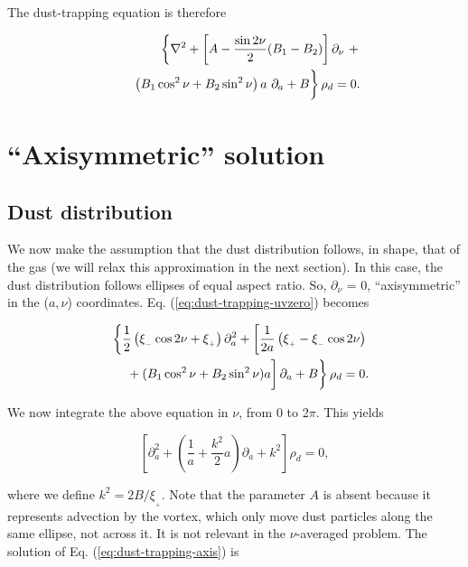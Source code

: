 \documentclass[apj]{emulateapj}
\def\white#1{\textcolor{white}{#1}}
\def\blue#1{\textcolor{blue}{ #1}}
\newcommand{\Laplace}{\nabla^2}
\newcommand{\Eq}[1]{Eq. (\ref{#1})}
\newcommand{\eq}[1]{\Eq{#1}}
\newcommand{\beq}{\begin{equation}}
\newcommand{\eeq}{\end{equation}}
\newcommand{\beqn}{\begin{eqnarray}}
\newcommand{\eeqn}{\end{eqnarray}}
\newcommand{\epsp}{\xi_{_{+}}}
\newcommand{\epsm}{\xi_{_{-}}}
\begin{document}
The dust-trapping equation is therefore 

\beqn 
&& \left\{ \Laplace{} + \left[A - \frac{\sin2\nu}{2}  (B_1 - B_2)\right]\partial_\nu \ +  \right.  \nonumber\\
&& \left. \white{\frac{1}{1}}\left( B_1 \cos^2\nu   + B_2\sin^2\nu
  \right) a \ \partial_a  + B \right\} \rho_d = 0. \label{eq:dust-trapping-uvzero}
\eeqn


\section{``Axisymmetric'' solution}
\label{sect:axisymmetric}

\subsection{Dust distribution}

We now make the assumption that the dust distribution follows, in shape, that of
the gas (we will relax this approximation in the next section). In this case, the
dust distribution follows ellipses of equal aspect ratio. So,
$\partial_\nu$ = 0, ``axisymmetric'' in the ($a,\nu$)
coordinates. \eq{eq:dust-trapping-uvzero} becomes

\beqn
&&\left\{\frac{1}{2}\left(\epsm \cos 2\nu +\epsp\right) \partial^2_a  +  \left[\frac{1}{2a}\left( \epsp - \epsm\cos 2\nu\right) \right.\right. \nonumber\\
&&\left.\left.\white{\frac{1}{1}}+ (B_1\cos^2\nu +  B_2\sin^2\nu)a\right] \partial_a  + B\right\} \rho_d = 0. \label{eq:axi}
\eeqn

We now integrate the above equation in $\nu$, from 0 to 2$\pi$. This yields

\beq\label{eq:dust-trapping-axis}
\left[\partial^2_a  +  \left(\frac{1}{a} +  \frac{k^2}{2}a\right) \partial_a  + k^2\right]\rho_d = 0, 
\eeq

\noindent where we define $k^2=2B/\epsp$. Note that the parameter $A$
is absent because it represents advection by the vortex, which only
move dust particles along the same ellipse, not across it. It is
not relevant in the $\nu$-averaged problem. The solution of
\eq{eq:dust-trapping-axis} is 
\end{document}
